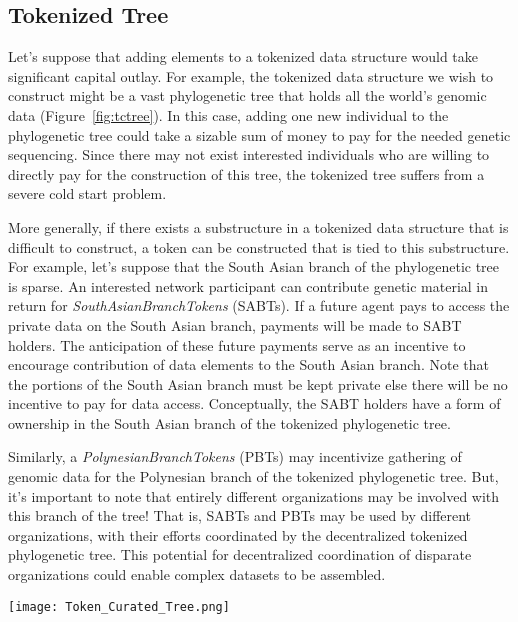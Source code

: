 \documentclass{llncs}
\begin{document}
\subsection{Tokenized Tree}

Let's suppose that adding elements to a tokenized data structure would take significant capital outlay. For example, the tokenized data structure we wish to construct might be a vast phylogenetic tree that holds all the world’s genomic data (Figure~\ref{fig:tctree}). In this case, adding one new individual to the phylogenetic tree could take a sizable sum of money to pay for the needed genetic sequencing. Since there may not exist interested individuals who are willing to directly pay for the construction of this tree, the tokenized tree suffers from a severe cold start problem.

More generally, if there exists a substructure in a tokenized data structure that is difficult to construct, a token can be constructed that is tied to this substructure. For example, let’s suppose that the South Asian branch of the phylogenetic tree is sparse. An interested network participant can contribute genetic material in return for \textit{SouthAsianBranchTokens} (SABTs). If a future agent pays to access the private data on the South Asian branch, payments will be made to SABT holders. The anticipation of these future payments serve as an incentive to encourage contribution of data elements to the South Asian branch. Note that the portions of the South Asian branch must be kept private else there will be no incentive to pay for data access. Conceptually, the SABT holders have a form of ownership in the South Asian branch of the tokenized phylogenetic tree.

Similarly, a \textit{PolynesianBranchTokens} (PBTs) may incentivize gathering of genomic data for the Polynesian branch of the tokenized phylogenetic tree. But, it's important to note that entirely different organizations may be involved with this branch of the tree! That is, SABTs and PBTs may be used by different organizations, with their efforts coordinated by the decentralized tokenized phylogenetic tree. This potential for decentralized coordination of disparate organizations could enable complex datasets to be assembled.


\begin{figure*}
  \centering
  \texttt{[image: Token\_Curated\_Tree.png]}
  \caption{A tokenized tree. Different subtrees are incentivized by different tokens.}
  \label{fig:tctree}
\end{figure*}
\end{document}
